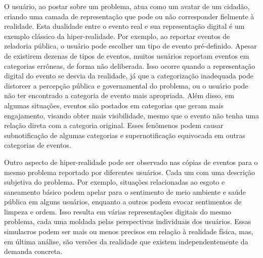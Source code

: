 O usuário, ao postar sobre um problema, atua como um avatar de um cidadão, criando uma camada de representação que pode ou não corresponder fielmente à realidade. Esta dualidade entre o evento real e sua representação digital é um exemplo clássico da hiper-realidade. Por exemplo, ao reportar eventos de zeladoria pública, o usuário pode escolher um tipo de evento pré-definido. Apesar de existirem dezenas de tipos de eventos, muitos usuários reportam eventos em categorias errôneas, de forma não deliberada. Isso ocorre quando a representação digital do evento se desvia da realidade, já que a categorização inadequada pode distorcer a percepção pública e governamental do problema, ou o usuário pode não ter encontrado a categoria de evento mais apropriada. Além disso, em algumas situações, eventos são postados em categorias que geram mais engajamento, visando obter mais visibilidade, mesmo que o evento não tenha uma relação direta com a categoria original. Esses fenômenos podem causar subnotificação de algumas categorias e supernotificação equivocada em outras categorias de eventos.

Outro aspecto de hiper-realidade pode ser observado nas cópias de eventos para o mesmo problema reportado por diferentes usuários. Cada um com uma descrição subjetiva do problema. Por exemplo, situações relacionadas ao esgoto e saneamento básico podem apelar para o sentimento de meio ambiente e saúde pública em alguns usuários, enquanto a outros podem evocar sentimentos de limpeza e ordem. Isso resulta em várias representações digitais do mesmo problema, cada uma moldada pelas perspectivas individuais dos usuários. Essas simulacros podem ser mais ou menos precisos em relação à realidade física, mas, em última análise, são versões da realidade que existem independentemente da demanda concreta.

